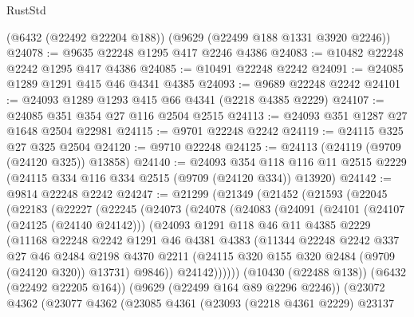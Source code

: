 \begin{lexlean}{RustStd}
\begin{coremodule}
    (@6432 (@22492 @22204 @188))
    (@9629 (@22499 @188 @1331 @3920 @2246))
@24078 := @9635 @22248 @1295 @417 @2246 @4386
@24083 := @10482 @22248 @2242 @1295 @417 @4386
@24085 := @10491 @22248 @2242
@24091 := @24085 @1289 @1291 @415 @46 @4341 @4385
@24093 := @9689 @22248 @2242
@24101 := @24093 @1289 @1293 @415 @66 @4341 (@2218 @4385 @2229)
@24107 := @24085 @351 @354 @27 @116 @2504 @2515
@24113 := @24093 @351 @1287 @27 @1648 @2504 @22981
@24115 := @9701 @22248 @2242
@24119 := @24115 @325 @27 @325 @2504
@24120 := @9710 @22248
@24125 := @24113 (@24119 (@9709 (@24120 @325)) @13858)
@24140 := @24093
    @354
    @118
    @116
    @11
    @2515
    @2229
    (@24115 @334 @116 @334 @2515 (@9709 (@24120 @334)) @13920)
@24142 := @9814 @22248 @2242
@24247 := @21299
    (@21349
      (@21452
        (@21593
          (@22045
            (@22183
              (@22227
                (@22245
                  (@24073
                    (@24078
                      (@24083
                        (@24091
                          (@24101
                            (@24107 (@24125 (@24140 @24142)))
                            (@24093
                              @1291
                              @118
                              @46
                              @11
                              @4385
                              @2229
                              (@11168
                                @22248
                                @2242
                                @1291
                                @46
                                @4381
                                @4383
                                (@11344
                                  @22248
                                  @2242
                                  @337
                                  @27
                                  @46
                                  @2484
                                  @2198
                                  @4370
                                  @2211
                                  (@24115 @320 @155 @320 @2484 (@9709 (@24120 @320)) @13731)
                                  @9846))
                              @24142))))))
                  (@10430 (@22488 @138))
                  (@6432 (@22492 @22205 @164))
                  (@9629 (@22499 @164 @89 @2296 @2246))
                  (@23072
                    @4362
                    (@23077
                      @4362
                      (@23085
                        @4361
                        (@23093
                          (@2218 @4361 @2229)
                          @23137

\end{coremodule}
\end{lexlean}
